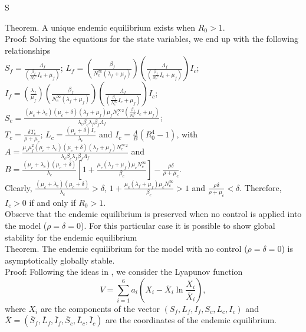 S\documentclass[preprint,12pt]{elsarticle}
\begin{document}
\noindent Theorem. A unique endemic equilibrium exists when $R_0>1$.\\
Proof: Solving the equations for the state variables, we end up with the following relationships\\
$S_f=\frac{\Lambda_f}{\left(\frac{\beta_f}{N_c^{\infty}}I_c+\mu_f\right)}$;
$L_f=\left(\frac{\beta_f}{N_c^{\infty}(\lambda_f+\mu_f)}\right)\left(\frac{\Lambda_f}{\left(\frac{\beta_f}{N_c^{\infty}}I_c+\mu_f\right)}\right)I_c$;\\
$I_f=\left(\frac{\lambda_f}{\mu_f}\right)\left(\frac{\beta_f}{N_c^{\infty}(\lambda_f+\mu_f)}\right)\left(\frac{\Lambda_f}{\left(\frac{\beta_f}{N_c^{\infty}}I_c+\mu_f\right)}\right)I_c$;
$S_c=\frac{(\mu_c+\lambda_c)(\mu_c+\delta)(\lambda_f+\mu_f)\mu_fN_c^{\infty}^2\left(\frac{\beta_f}{N_c^{\infty}}I_c+\mu_f\right)}{\lambda_c\beta_c\lambda_f\beta_f\Lambda_f}$;\\
$T_c=\frac{\delta T_c}{\rho+\mu_c}$;
$L_c=\frac{(\mu_c+\delta)I_c}{\lambda_c}$ and
$I_c=\frac{A}{B}\left(R_0^4-1\right)$,
with\\
$A=\frac{\mu_c\mu_f^2(\mu_c+\lambda_c)(\mu_c+\delta)(\lambda_f+\mu_f)N_c^{\infty}^2}{\lambda_c\beta_c\lambda_f\beta_f\Lambda_f}$ and $B=\frac{(\mu_c+\lambda_c)(\mu_c+\delta)}{\lambda_c}\left[1+{\frac{\mu_c(\lambda_f+\mu_f)\mu_cN_c^{\infty}}{\beta_c}}\right]-\frac{\rho\delta}{\rho+\mu_c}$.\\
Clearly, $\frac{(\mu_c+\lambda_c)(\mu_c+\delta)}{\lambda_c}>\delta$, $1+{\frac{\mu_c(\lambda_f+\mu_f)\mu_c N_c^{\infty}}{\beta_c}}>1$ and $\frac{\rho\delta}{\rho+\mu_c}<\delta$. Therefore, $I_c>0$ if and only if $R_0>1$.\\

\noindent Observe that the endemic equilibrium is preserved when no control is applied into the model ($\rho=\delta=0$). For this particular case it is possible to show global stability for the endemic equilibrium\\

\noindent Theorem. The endemic equilibrium for the model with no control ($\rho=\delta=0$) is asymptotically globally stable.\\
Proof: Following the ideas in \cite{Zhou:2014}, we consider the Lyapunov function
$$V=\sum_{i=1}^6a_i\left(X_i-\overline{X}_i\ln{\frac{X_i}{\overline{X}_i}}\right),$$ where $X_i$ are the components of the vector $(S_f,L_f,I_f,S_c,L_c,I_c)$ and $\overline{X}=(\overline{S}_f,\overline{L}_f,\overline{I}_f,\overline{S}_c,\overline{L}_c,\overline{I}_c)$ are the coordinates of the endemic equilibrium. 
\end{document}
